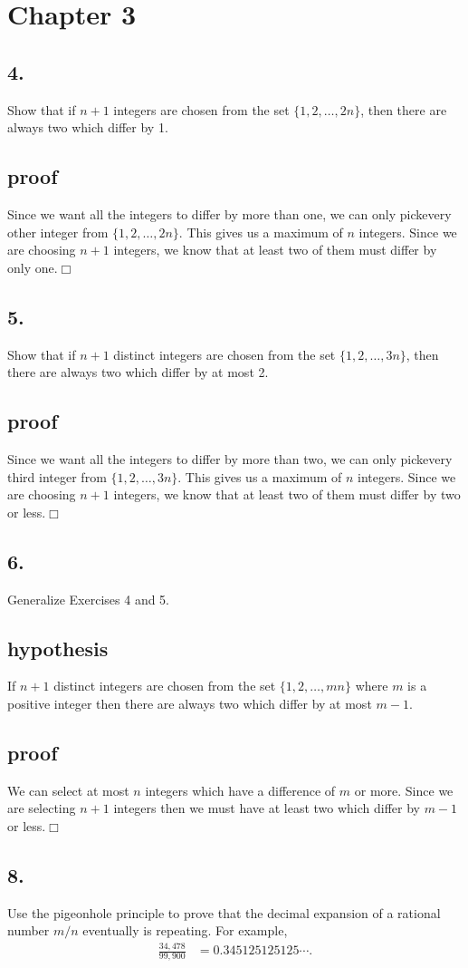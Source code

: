 \documentclass{article}
\begin{document}
\section*{Chapter 3}
\subsection*{4.}
Show that if $n+1$ integers are chosen from the set $\{1,2,\dots,2n\}$, then there are always two which differ by 1.
\subsection*{proof}
Since we want all the integers to differ by more than one, we can only pickevery other integer from $\{1,2,\dots,2n\}$. This gives us a maximum of $n$ integers. Since we are choosing $n+1$ integers, we know that at least two of them must differ by only one.$\Box$
\subsection*{5.}
Show that if $n+1$ distinct integers are chosen from the set $\{1,2,\dots,3n\}$, then there are always two which differ by at most 2.
\subsection*{proof}
Since we want all the integers to differ by more than two, we can only pickevery third integer from $\{1,2,\dots,3n\}$. This gives us a maximum of $n$ integers. Since we are choosing $n+1$ integers, we know that at least two of them must differ by two or less.$\Box$
\subsection*{6.}
Generalize Exercises 4 and 5.
\subsection*{hypothesis}
If $n+1$ distinct integers are chosen from the set $\{1,2,\dots,mn\}$ where $m$ is a positive integer then there are always two which differ by at most $m-1$.
\subsection*{proof}
We can select at most $n$ integers which have a difference of $m$ or more. Since we are selecting $n+1$ integers then we must have at least two which differ by $m-1$ or less.$\Box$
\subsection*{8.}
Use the pigeonhole principle to prove that the decimal expansion of a rational number $m/n$ eventually is repeating. For example,
\begin{align*}
  \frac{34,478}{99,900}&=0.345125125125\cdots.
\end{align*}
\end{document}
